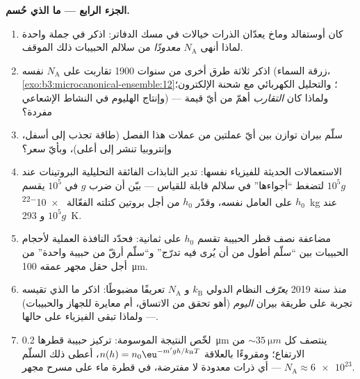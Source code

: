 \begin{problem}
\medskip\noindent\textbf{الجزء الرابع --- ما الذي حُسم.}
\begin{enumerate}[resume]
  \item كان أوستفالد وماخ يعدّان الذرات خيالات في مسك
        الدفاتر: اذكر في جملة واحدة لماذا أنهى $N_{\text{A}}$
        \emph{معدودًا} من سلالم الحبيبات ذلك الموقف.
  \item اذكر ثلاثة طرق أخرى من سنوات 1900 تقاربت على $N_{\text{A}}$
        نفسه (زرقة السماء،
        \cref{exo:b3:microcanonical-ensemble:12}؛ والتحليل الكهربائي
        مع شحنة الإلكترون؛ وإنتاج الهليوم في النشاط
        الإشعاعي) --- ولماذا كان \emph{التقارب} أهمّ
        من أيّ قيمة مفردة؟
  \item سلّم بيران توازن بين أيّ عملتين من عملات هذا الفصل
        (طاقة تجذب إلى أسفل، وإنتروبيا تنشر إلى أعلى)، وبأيّ سعر؟
  \item الاستعمالات الحديثة للفيزياء نفسها: تدير النابذات
        الفائقة التحليلية البروتينات عند $10^5g$ لتضغط
        ``أجواءها'' في سلالم قابلة للقياس --- بيّن
        أن ضرب $g$ في $10^5$ يقسم $h_0$ على العامل
        نفسه، وقدّر $h_0$ من أجل بروتين كتلته الفعّالة
        \qty{e-22}{kg} عند $10^5g$ و \qty{293}{K}.
  \item مضاعفة نصف قطر الحبيبة تقسم $h_0$ على ثمانية: فحدّد
        النافذة العملية لأحجام الحبيبات بين ``سلّم أطول
        من أن يُرى فيه تدرّج'' و``سلّم أرقّ من حبيبة واحدة''
        من أجل حقل مجهر عمقه \qty{100}{\micro m}.
  \item منذ سنة 2019 \emph{يعرّف} النظام الدولي $k_{\text{B}}$ و
        $N_{\text{A}}$ تعريفًا مضبوطًا: اذكر ما الذي تقيسه تجربة
        على طريقة بيران \emph{اليوم} (أهو تحقق من الاتساق، أم
        معايرة للجهاز والحبيبات) --- ولماذا تبقى
        الفيزياء على حالها.
  \item لخّص النتيجة الموسومة: تركيز حبيبة قطرها \qty{0.2}{\micro m}
        ينتصف كل $\sim\qty{35}{\micro m}$ من
        الارتفاع؛ ومقروءًا بالعلاقة $n(h) = n_0\eu^{-m'gh/k_{\text{B}}T}$،
        أعطى ذلك السلّم $N_{\text{A}} \approx \num{6e23}$ ---
        أي ذرات معدودة لا مفترضة، في قطرة ماء على
        مسرح مجهر.
\end{enumerate}
\end{problem}
